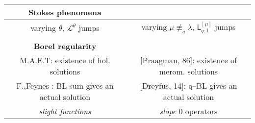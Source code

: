 \documentclass[11pt,a4paper,twoside,leqno,noamsfonts]{amsart}
\numberwithin{equation}{section}
\begin{document}
\begin{center}
\begin{tabular}{c|c}
\hline
\textbf{Stokes phenomena} & \\
\hline 
 varying $\theta$, $\mathcal{L}^{\theta}$ jumps & varying $\mu\not\equiv_{q}\lambda$, $\mathsf{L}_{q;1}^{[\mu]}$ jumps\\
 & \\
 \hline
 \textbf{Borel regularity} & \\
 \hline
 M.A.E.T: existence of hol. solutions & [Praagman, 86]: existence of merom. solutions \\
 F.,Feynes : BL sum gives an actual solution & [Dreyfus, 14]: q--BL gives an actual solution \\
 \textit{slight functions} & \textit{slope} $0$ operators \\
\end{tabular}
\end{center}





\end{document}
